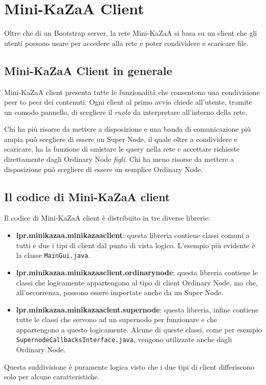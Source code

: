 \chapter{Mini-KaZaA Client}
Oltre che di un Bootstrap server, la rete Mini-KaZaA si basa su un client che gli utenti possono usare per accedere alla rete e poter condividere e scaricare file.
\section{Mini-KaZaA Client in generale}
Mini-KaZaA client presenta tutte le funzionalità che consentono una condivisione peer to peer dei contenuti.
Ogni client al primo avvio chiede all'utente, tramite un comodo pannello, di scegliere il \emph{ruolo} da interpretare all'interno della rete.

Chi ha più risorse da mettere a disposizione e una banda di comunicazione più ampia può scegliere di essere un Super Node, il quale oltre a condividere e scaricare, ha la funzione di smistare le query nella rete e accettare richieste direttamente dagli Ordinary Node \emph{figli}. Chi ha meno risorse da mettere a disposizione può scegliere di essere un semplice Ordinary Node.

\section{Il codice di Mini-KaZaA client}
Il codice di Mini-KaZaA client è distribuito in tre diverse librerie:
\begin{itemize}
 \item \textbf{lpr.minikazaa.minikazaaclient}: questa libreria contiene classi comuni a tutti e due i tipi di client dal punto di vista logico. L'esempio più evidente è la classe \verb|MainGui.java|.
 \item \textbf{lpr.minikazaa.minikazaaclient.ordinarynode}: questa libreria contiene le classi che logicamente appartengono al tipo di client Ordinary Node, ma che, all'occorrenza, possono essere importate anche da un Super Node.
 \item \textbf{lpr.minikazaa.minikazaaclent.supernode}: questa libreria, infine contiene tutte le classi che servono ad un supernodo per funzionare e che appartengono a questo logicamente. Alcune di queste classi, come per esempio \verb|SupernodeCallbacksInterface.java|, vengono utilizzate anche dagli Ordinary Node.
\end{itemize}

Questa suddivisione è puramente logica visto che i due tipi di client differiscono solo per alcune caratteristiche.

